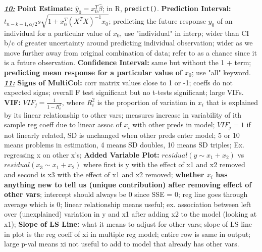 \documentclass[8pt]{extarticle}
\begin{document}
\textit{\textbf{\underline{10:}}}
\textbf{Point Estimate:} $\hat{y}_0 = x^T_0\hat{\beta}$; in R, \texttt{predict()}.
\textbf{Prediction Interval:} $t_{n-k-1, \alpha/2} s \sqrt{1 + x^T_0
(X^TX)^{-1}x_0}$; predicting the future response $y_0$ of an individual for a 
particular value of $x_0$, use "individual" in interp; wider than CI b/c of 
greater uncertainty around predicting individual observation; wider as we move 
further away from original combination of data; refer to as a chance since it 
is a future observation.
\textbf{Confidence Interval:} same but without the 1 + term; \textbf{predicting 
mean response for a particular value of $x_0$}; use "all" keyword.\\

\textit{\textbf{\underline{11:}}}
\textbf{Signs of MultiCol:} corr matrix values close to 1 or -1; coeffs do not 
expected signs; overall F test significant but no t-tests significant; large 
VIFs. \textbf{VIF:} $VIF_j = \frac{1}{1 - R^2_{i}}$, where $R^2_{i}$ is the proportion 
of variation in $x_i$ that is explained by its linear relationship to other vars; 
measures increase in variability of ith sample reg coeff due to linear assoc of 
$x_i$ with other preds in model; $VIF_j = 1$ if not linearly related, SD is 
unchanged when other preds enter model; 5 or 10 means problems in estimation, 
4 means SD doubles, 10 means SD triples; Ex. regressing x on other x's;
\textbf{Added Variable Plot:} $residual(y\sim x_1+x_2)$ vs $residual(x_3\sim 
x_1+x_2)$ where first is y with the effect of x1 and x2 removed and second is x3 
with the effect of x1 and x2 removed; \textbf{whether $x_i$ has anything new 
to tell us (unique contribution) after removing effect of other vars}; intercept 
should always be 0 since SSE = 0; reg line goes through average which is 0; 
linear relationship means useful; ex. association between left over (unexplained) 
variation in y and x1 after adding x2 to the model (looking at x1); 
\textbf{Slope of LS Line:} what it means to adjust for other vars; slope of LS 
line in plot is the reg coeff of xi in multiple reg model; entire row is same in
output; large p-val means xi not useful to add to model that already has other
vars.\\
\end{document}
